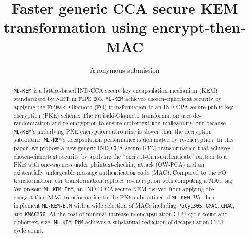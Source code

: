 \documentclass[runningheads]{llncs}
\begin{document}
\title{Faster generic CCA secure KEM transformation using encrypt-then-MAC}

\author{
    Anonymous submission
}

\institute{
}

\maketitle              %
%
\begin{abstract}
    \texttt{ML-KEM} is a lattice-based IND-CCA secure key encapsulation mechanism (KEM) standardized by NIST in FIPS 203. \texttt{ML-KEM} achieves chosen-ciphertext security by applying the Fujisaki-Okamoto (FO) transformation to an IND-CPA secure public key encryption (PKE) scheme. The Fujisaki-Okamoto transformation uses de-randomization and re-encryption to ensure ciphertext non-malleability, but because \texttt{ML-KEM}'s underlying PKE encryption subroutine is slower than the decryption subroutine, \texttt{ML-KEM}'s decapsulation performance is dominated by re-encryption. In this paper, we propose a new generic IND-CCA secure KEM transformation that achieves chosen-ciphertext security by applying the ``encrypt-then-authenticate'' pattern to a PKE with one-wayness under plaintext-checking attack (OW-PCA) and an existentially unforgeable message authentication code (MAC). Compared to the FO transformation, our transformation replaces re-encryption with computing a MAC tag. We present \texttt{ML-KEM-EtM}, an IND-1CCA secure KEM derived from applying the encrypt-then-MAC transformation to the PKE subroutines of \texttt{ML-KEM}. We then implement \texttt{ML-KEM-EtM} with a wide selection of MACs including \texttt{Poly1305}, \texttt{\texttt{GMAC}}, \texttt{\texttt{CMAC}}, and \texttt{\texttt{KMAC256}}. At the cost of minimal increase in encapsulation CPU cycle count and ciphertext size, \texttt{ML-KEM-EtM} achieves a substantial reduction of decapsulation CPU cycle count.
\end{abstract}
\end{document}
